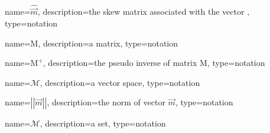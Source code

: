 	\newcommand{\skewmat}[1]{\ensuremath{\widehat{#1}}}
	{%
		name=\skewmat{\vec{m}},
		description=the skew matrix associated with the vector ,
		type=notation
	}

	\newcommand{\mat}[1]{\ensuremath{\boldsymbol{\mathrm{#1}}}}
	{%
		name=\mat{M},
		description=a matrix,
		type=notation
	}

	\newcommand{\pseudoinv}[1]{\ensuremath{{#1}^{+}}}
	{%
		name=\pseudoinv{\mat{M}},
		description=the pseudo inverse of matrix \mat{M},
		type=notation
	}

	\newcommand{\vecspace}[1]{\ensuremath{\mathscr{#1}}}
	{%
		name=\vecspace{M},
		description=a vector space,
		type=notation
	}

	\newcommand{\norm}[1]{\ensuremath{\left|\left|#1\right|\right|}}
	{%
		name=\norm{\vec{m}},
		description=the norm of vector $\vec{m}$,
		type=notation
	}

	\newcommand{\set}[1]{\ensuremath{\mathcal{#1}}}
	{%
		name=\set{M},
		description=a set,
		type=notation
	}

